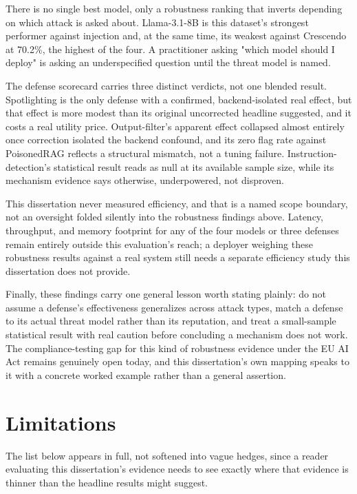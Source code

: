 There is no single best model, only a robustness ranking that inverts
depending on which attack is asked about. Llama-3.1-8B is this dataset's
strongest performer against injection and, at the same time, its
weakest against Crescendo at 70.2\%, the highest of the four. A
practitioner asking "which model should I deploy" is asking an
underspecified question until the threat model is named.

The defense scorecard carries three distinct verdicts, not one blended
result. Spotlighting is the only defense with a confirmed,
backend-isolated real effect, but that effect is more modest than its
original uncorrected headline suggested, and it costs a real utility
price. Output-filter's apparent effect collapsed almost entirely once
correction isolated the backend confound, and its zero flag rate against
PoisonedRAG reflects a structural mismatch, not a tuning failure.
Instruction-detection's statistical result reads as null at its
available sample size, while its mechanism evidence says otherwise,
underpowered, not disproven.

This dissertation never measured efficiency, and that is a named scope
boundary, not an oversight folded silently into the robustness findings
above. Latency, throughput, and memory footprint for any of the four
models or three defenses remain entirely outside this evaluation's
reach; a deployer weighing these robustness results against a real
system still needs a separate efficiency study this dissertation does
not provide.

Finally, these findings carry one general lesson worth stating plainly:
do not assume a defense's effectiveness generalizes across attack types,
match a defense to its actual threat model rather than its reputation,
and treat a small-sample statistical result with real caution before
concluding a mechanism does not work. The compliance-testing gap for
this kind of robustness evidence under the EU AI Act remains genuinely
open today, and this dissertation's own mapping speaks to it with a
concrete worked example rather than a general assertion.

\section{Limitations}

The list below appears in full, not softened into vague hedges, since a
reader evaluating this dissertation's evidence needs to see exactly
where that evidence is thinner than the headline results might suggest.

